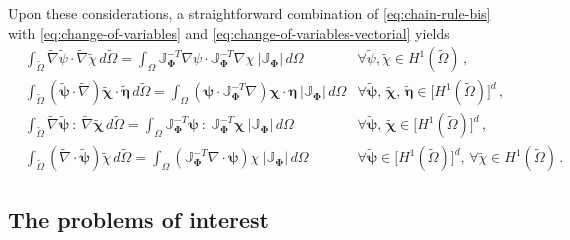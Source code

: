 \documentclass[12pt, a4paper, twoside, openright, notitlepage]{report}
\numberwithin{equation}{chapter}
\theoremstyle{theorem}
\theoremstyle{definition}
\theoremstyle{remark}
\theoremstyle{proposition}
\numberwithin{figure}{chapter}
\newcommand{\wt}[1]{\widetilde{#1}}
\newcommand{\bg}[1]{\boldsymbol{#1}}
\begin{document}
		Upon these considerations, a straightforward combination of \eqref{eq:chain-rule-bis} with \eqref{eq:change-of-variables} and \eqref{eq:change-of-variables-vectorial} yields
		\begin{align}
			\label{eq:change-of-variables-first}
			& \int_{\wt{\Omega}} \wt{\nabla} \wt{\psi} \cdot \wt{\nabla} \wt{\chi} \, d \wt{\Omega} = \int_{\Omega} \mathbb{J}^{-T}_{\bg{\Phi}} \nabla \psi \cdot \mathbb{J}^{-T}_{\bg{\Phi}} \nabla \chi ~ \lvert \mathbb{J}_{\bg{\Phi}} \rvert \, d \Omega & \forall \wt{\psi}, \wt{\chi} \in H^1(\wt{\Omega}) \, , \\
			\label{eq:change-of-variables-second}
			& \int_{\wt{\Omega}} \left( \wt{\bg{\psi}} \cdot \wt{\nabla} \right) \wt{\bg{\chi}} \cdot \wt{\bg{\eta}} \, d \wt{\Omega} = \int_{\Omega} \left( \bg{\psi} \cdot \mathbb{J}^{-T}_{\bg{\Phi}} \nabla \right) \bg{\chi} \cdot \bg{\eta} ~ \lvert \mathbb{J}_{\bg{\Phi}} \rvert \, d \Omega & \forall \wt{\bg{\psi}}, \, \wt{\bg{\chi}}, \, \wt{\bg{\eta}} \in \big[ H^1(\wt{\Omega}) \big]^d \, , \\
			\label{eq:change-of-variables-third}
			& \int_{\wt{\Omega}} \wt{\nabla} \wt{\bg{\psi}} ~ : ~ \wt{\nabla} \wt{\bg{\chi}} \, d \wt{\Omega} = \int_{\Omega} \mathbb{J}^{-T}_{\bg{\Phi}} \bg{\psi} ~ : ~ \mathbb{J}^{-T}_{\bg{\Phi}} \bg{\chi} ~ \lvert \mathbb{J}_{\bg{\Phi}} \rvert \, d \Omega & \forall \wt{\bg{\psi}}, \, \wt{\bg{\chi}} \in \big[ H^1(\wt{\Omega}) \big]^d \, , \\
			\label{eq:change-of-variables-fourth}
			& \int_{\wt{\Omega}} \left( \wt{\nabla} \cdot \wt{\bg{\psi}} \right) \wt{\chi} \, d \wt{\Omega} = \int_{\Omega} \left( \mathbb{J}^{-T}_{\bg{\Phi}} \nabla \cdot \bg{\psi} \right) \chi ~ \lvert \mathbb{J}_{\bg{\Phi}} \rvert \, d \Omega & \forall \wt{\bg{\psi}} \in \big[ H^1(\wt{\Omega}) \big]^d, \, \forall \wt{\chi} \in H^1(\wt{\Omega}) \, .
		\end{align}  
		
	\vspace*{0.3cm}
		
	\subsection{The problems of interest}
	\label{section:The problems of interest}
	
\end{document}
